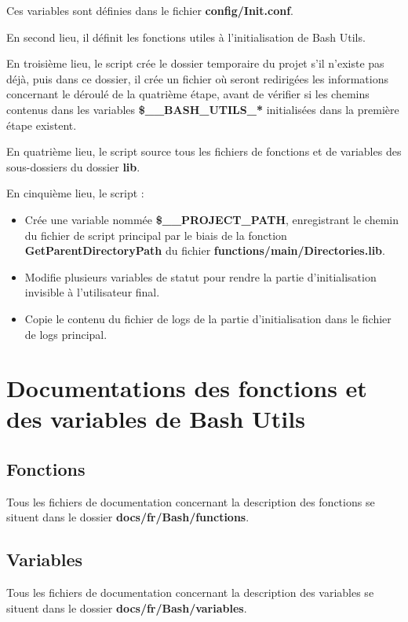 \documentclass[a4paper,10pt]{article}
\begin{document}
Ces variables sont définies dans le fichier \color{lime}\textbf{config/Init.conf}\color{white}.

En second lieu, il définit les fonctions utiles à l'initialisation de Bash Utils.

En troisième lieu, le script crée le dossier temporaire du projet s'il n'existe pas déjà, puis dans ce dossier, il crée un fichier où seront redirigées les informations concernant le déroulé de la quatrième étape, avant de vérifier si les chemins contenus dans les variables \color{orange}\textbf{\$\_\_BASH\_UTILS\_*}\color{white} initialisées dans la première étape existent.

En quatrième lieu, le script source tous les fichiers de fonctions et de variables des sous-dossiers du dossier \color{lime}\textbf{lib}\color{white}.

En cinquième lieu, le script :
\begin{itemize}
    \item Crée une variable nommée \color{orange}\textbf{\$\_\_PROJECT\_PATH}\color{white}, enregistrant le chemin du fichier de script principal par le biais de la fonction \color{mauve}\textbf{GetParentDirectoryPath}\color{white} du fichier \color{lime}\textbf{functions/main/Directories.lib}\color{white}.
    
    \item Modifie plusieurs variables de statut pour rendre la partie d'initialisation invisible à l'utilisateur final.
    
    \item Copie le contenu du fichier de logs de la partie d'initialisation dans le fichier de logs principal.
\end{itemize}


\color{red}
\section{Documentations des fonctions et des variables de Bash Utils}\color{white}

\color{green}
\subsection{Fonctions}\color{white}
Tous les fichiers de documentation concernant la description des fonctions se situent dans le dossier \color{lime}\textbf{docs/fr/Bash/functions}\color{white}.

\color{green}
\subsection{Variables}\color{white}
Tous les fichiers de documentation concernant la description des variables se situent dans le dossier \color{lime}\textbf{docs/fr/Bash/variables}\color{white}.
\end{document}
